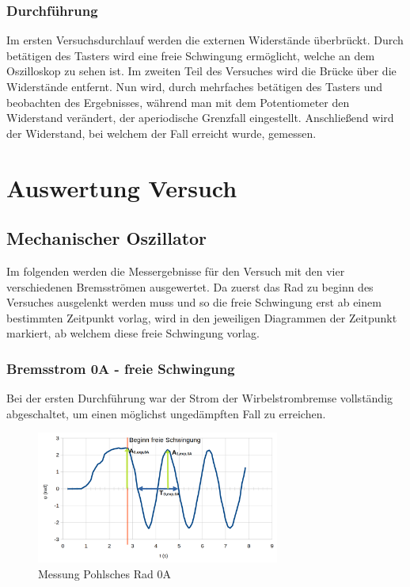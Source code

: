 \documentclass[a4paper]{scrartcl}
\numberwithin{equation}{subsection}
\begin{document}
\subsubsection{Durchführung}
Im ersten Versuchsdurchlauf werden die externen Widerstände überbrückt. Durch betätigen des Tasters wird eine freie Schwingung ermöglicht, welche an dem Oszilloskop zu sehen ist.
Im zweiten Teil des Versuches wird die Brücke über die Widerstände entfernt. Nun wird, durch mehrfaches betätigen des Tasters und beobachten des Ergebnisses, während man mit dem Potentiometer den Widerstand verändert, der aperiodische Grenzfall eingestellt. 
Anschließend wird der Widerstand, bei welchem der Fall erreicht wurde, gemessen.

\newpage

\section{Auswertung Versuch}
\subsection{Mechanischer Oszillator}
Im folgenden werden die Messergebnisse für den Versuch mit den vier verschiedenen Bremsströmen ausgewertet. Da zuerst das Rad zu beginn des Versuches ausgelenkt werden muss und so die freie Schwingung erst ab einem bestimmten Zeitpunkt vorlag, wird in den jeweiligen Diagrammen der Zeitpunkt markiert, ab welchem diese freie Schwingung vorlag.

\subsubsection{Bremsstrom 0A - freie Schwingung}
Bei der ersten Durchführung war der Strom der Wirbelstrombremse vollständig abgeschaltet, um einen möglichst ungedämpften Fall zu erreichen.

\begin{figure}[H]
\includegraphics[width=8cm]{Messung_Rad_graph_0A}
\centering
\caption{Messung Pohlsches Rad 0A}
\centering
\end{figure}
\end{document}
